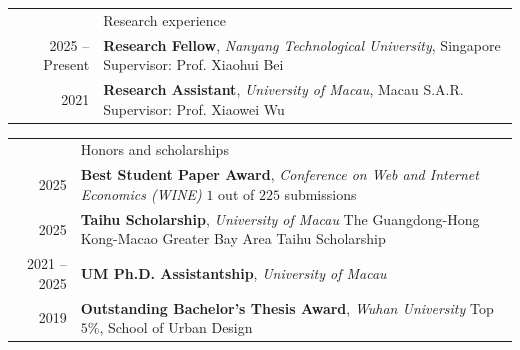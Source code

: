 \documentclass[letterpaper, 11pt]{article}
\newcommand{\headingfont}{\Large\color{OliveGreen}}
\newenvironment{SectionTable}[1]{
	\renewcommand*{\arraystretch}{1.2}
	\setlength{\tabcolsep}{10pt}
	\begin{longtable}{Rp{5.2in}} & #1 \\}
{\end{longtable}\vspace{-1cm}}
\newenvironment{SectionTableSingleSpace}[1]{
	\renewcommand*{\arraystretch}{1.2}
	\setlength{\tabcolsep}{10pt}
	\begin{longtable}{Rp{5.2in}} & #1 \\[0.6em]}
{\end{longtable}\vspace{-.7cm}}
\begin{document}

\begin{SectionTable}{\headingfont Research experience}

2025 -- Present &
\textbf{Research Fellow}, \textit{Nanyang Technological University}, Singapore \newline
Supervisor: Prof. Xiaohui Bei\\

2021 &
\textbf{Research Assistant}, \textit{University of Macau}, Macau S.A.R. \newline
Supervisor: Prof. Xiaowei Wu\\
\end{SectionTable}


\begin{SectionTableSingleSpace}{\headingfont Honors and scholarships}
2025 & 
\textbf{Best Student Paper Award}, \textit{Conference on Web and Internet Economics (WINE)}\newline
$1$ out of $225$ submissions\\

2025 & 
\textbf{Taihu Scholarship}, \textit{University of Macau}\newline
The Guangdong-Hong Kong-Macao Greater Bay Area Taihu Scholarship\\

2021 -- 2025 &
\textbf{UM Ph.D. Assistantship}, \textit{University of Macau}\\

2019 &
\textbf{Outstanding Bachelor's Thesis Award}, \textit{Wuhan University}\newline
Top $5\%$, School of Urban Design\\

\end{SectionTableSingleSpace}


\end{document}
